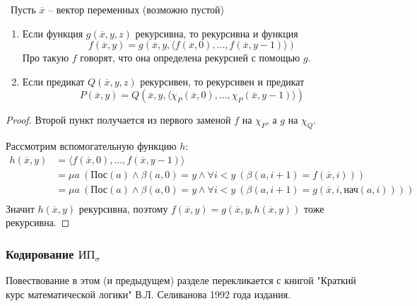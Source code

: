 \begin{theorem}\
    Пусть $\overline{x}$ -- вектор переменных (возможно пустой)
    \begin{enumerate}
        \item Если функция $g(\overline{x}, y, z)$ рекурсивна, то рекурсивна и функция $$f(\overline{x}, y)=g(\overline{x}, y, \langle f(\overline{x}, 0), \ldots, f(\overline{x}, y-1)\rangle)$$ Про такую $f$ говорят, что она определена рекурсией с помощью $g$.
        \item Если предикат $Q(\overline{x}, y, z)$ рекурсивен, то рекурсивен и предикат $$P(\overline{x}, y)=Q(\overline{x}, y, \langle \chi_P(\overline{x}, 0), \ldots, \chi_P(\overline{x}, y-1)\rangle)$$
    \end{enumerate}

\end{theorem}

\begin{proof}
Второй пункт получается из первого заменой $f$ на $\chi_P$, а $g$ на $\chi_Q$.

Рассмотрим вспомогательную функцию $h$:
\[
    \begin{aligned}
        h(\overline{x}, y) &= \langle f(\overline{x}, 0), \ldots, f(\overline{x}, y-1)\rangle \\ 
                           &= \mu a~(\text{Пос}(a)\wedge \beta(a, 0)=y \wedge \forall i<y~(\beta(a, i+1)=f(\overline{x}, i))) \\
                           &= \mu a~(\text{Пос}(a)\wedge \beta(a, 0)=y \wedge \forall i<y~(\beta(a, i+1)=g(\overline{x}, i, \text{нач}(a, i)))) \\
    \end{aligned}
\]
Значит $h(\overline{x}, y)$ рекурсивна, поэтому $f(\overline{x}, y) = g(\overline{x}, y, h(\overline{x}, y))$ тоже рекурсивна.
\end{proof}


\subsubsection{Кодирование $\text{ИП}_\sigma$}
\begin{remark}
    Повествование в этом (и предыдущем) разделе перекликается с книгой "Краткий курс математической логики" В.Л. Селиванова 1992 года издания.
\end{remark}

